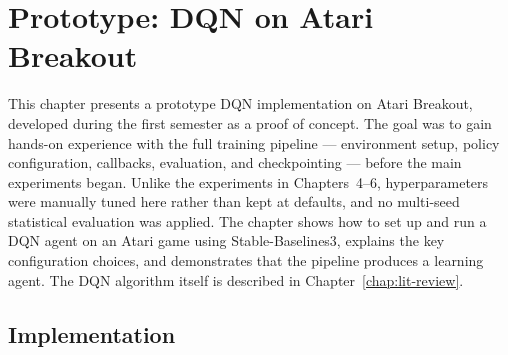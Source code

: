 
\chapter{Prototype: DQN on Atari Breakout}

\ifpdf
    \graphicspath{{3_prototypes/figures/PNG/}{3_prototypes/figures/PDF/}{3_prototypes/figures/}}
\else
    \graphicspath{{3_prototypes/figures/EPS/}{3_prototypes/figures/}}
\fi

{\color{red}
This chapter presents a prototype DQN implementation on Atari Breakout, developed during the first semester as a proof of concept. The goal was to gain hands-on experience with the full training pipeline --- environment setup, policy configuration, callbacks, evaluation, and checkpointing --- before the main experiments began. Unlike the experiments in Chapters~4--6, hyperparameters were manually tuned here rather than kept at defaults, and no multi-seed statistical evaluation was applied. The chapter shows how to set up and run a DQN agent on an Atari game using Stable-Baselines3, explains the key configuration choices, and demonstrates that the pipeline produces a learning agent. The DQN algorithm itself is described in Chapter~\ref{chap:lit-review}.
}

\section{Implementation}

